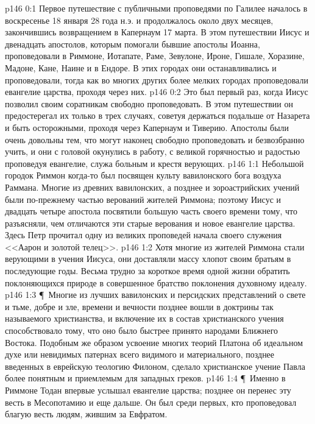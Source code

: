 \vs p146 0:1 Первое путешествие с публичными проповедями по Галилее началось в воскресенье 18 января 28 года н.э. и продолжалось около двух месяцев, закончившись возвращением в Капернаум 17 марта. В этом путешествии Иисус и двенадцать апостолов, которым помогали бывшие апостолы Иоанна, проповедовали в Риммоне, Иотапате, Раме, Зевулоне, Ироне, Гишале, Хоразине, Мадоне, Кане, Наине и в Ендоре. В этих городах они останавливались и проповедовали, тогда как во многих других более мелких городах проповедовали евангелие царства, проходя через них.
\vs p146 0:2 Это был первый раз, когда Иисус позволил своим соратникам свободно проповедовать. В этом путешествии он предостерегал их только в трех случаях, советуя держаться подальше от Назарета и быть осторожными, проходя через Капернаум и Тиверию. Апостолы были очень довольны тем, что могут наконец свободно проповедовать и безвозбранно учить, и они с головой окунулись в работу, с великой горячностью и радостью проповедуя евангелие, служа больным и крестя верующих.
\vs p146 1:1 Небольшой городок Риммон когда\hyp{}то был посвящен культу вавилонского бога воздуха Раммана. Многие из древних вавилонских, а позднее и зороастрийских учений были по\hyp{}прежнему частью верований жителей Риммона; поэтому Иисус и двадцать четыре апостола посвятили большую часть своего времени тому, что разъясняли, чем отличаются эти старые верования и новое евангелие царства. Здесь Петр прочитал одну из великих проповедей начала своего служения <<Аарон и золотой телец>>.
\vs p146 1:2 Хотя многие из жителей Риммона стали верующими в учения Иисуса, они доставляли массу хлопот своим братьям в последующие годы. Весьма трудно за короткое время одной жизни обратить поклоняющихся природе в совершенное братство поклонения духовному идеалу.
\vs p146 1:3 \P\ Многие из лучших вавилонских и персидских представлений о свете и тьме, добре и зле, времени и вечности позднее вошли в доктрины так называемого христианства, и включение их в состав христианского учения способствовало тому, что оно было быстрее принято народами Ближнего Востока. Подобным же образом усвоение многих теорий Платона об идеальном духе или невидимых патернах всего видимого и материального, позднее введенных в еврейскую теологию Филоном, сделало христианское учение Павла более понятным и приемлемым для западных греков.
\vs p146 1:4 \P\ Именно в Риммоне Тодан впервые услышал евангелие царства; позднее он перенес эту весть в Месопотамию и еще дальше. Он был среди первых, кто проповедовал благую весть людям, жившим за Евфратом.
